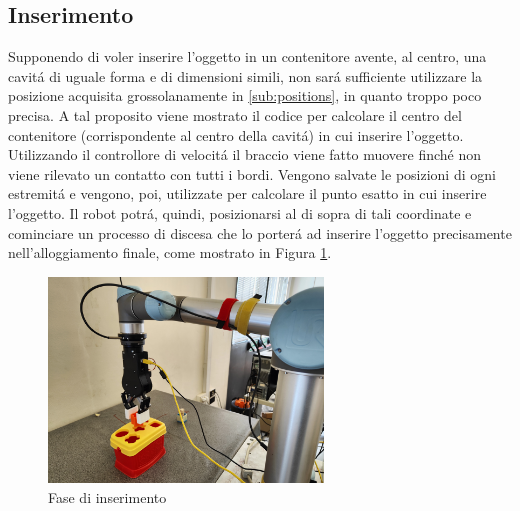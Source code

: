 \subsection{Inserimento} \label{sub:insertion}
Supponendo di voler inserire l'oggetto in un contenitore avente, al centro, una cavit\'{a} di uguale forma e di dimensioni simili, 
non sar\'{a} sufficiente utilizzare la posizione acquisita grossolanamente in \ref{sub:positions}, in quanto troppo poco precisa. 
A tal proposito viene mostrato il codice per calcolare il centro del contenitore (corrispondente al 
centro della cavit\'{a}) in cui inserire l'oggetto\footnotemark{}. Utilizzando il controllore di velocit\'{a} il braccio viene fatto muovere 
finch\'{e} non viene rilevato un contatto con tutti i bordi. Vengono salvate le posizioni di ogni estremit\'{a} e vengono, poi, 
utilizzate per calcolare il punto esatto in cui inserire l'oggetto. Il robot potr\'{a}, quindi, posizionarsi al di sopra di 
tali coordinate e cominciare un processo di discesa che lo porter\'{a} ad inserire l'oggetto precisamente nell'alloggiamento finale, 
come mostrato in Figura \ref{fig:insertion}. 
\newpage
\begin{figure}[H]
    \centering
    \includegraphics*[width=0.65\textwidth]{images/insertion.jpg}
    \caption{Fase di inserimento}
    \label{fig:insertion}
\end{figure}
